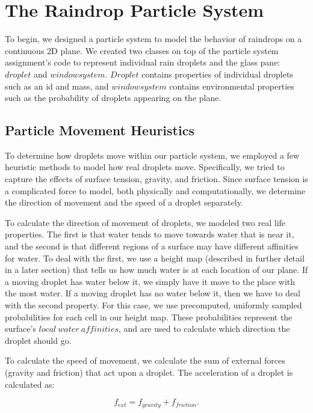 \documentclass[10pt,twocolumn,letterpaper]{article}
\begin{document}
\section{The Raindrop Particle System}

To begin, we designed a particle system to model the behavior of raindrops on a continuous 2D plane. We created two classes on top of the particle system assignment's code to represent individual rain droplets and the glass pane: $droplet$ and $windowsystem$. $Droplet$ contains properties of individual droplets such as an id and mass, and $windowsystem$ contains environmental properties such as the probability of droplets appearing on the plane.

\subsection{Particle Movement Heuristics}

To determine how droplets move within our particle system, we employed a few heuristic methods to model how real droplets move. Specifically, we tried to capture the effects of surface tension, gravity, and friction. Since surface tension is a complicated force to model, both physically and computationally, we determine the direction of movement and the speed of a droplet separately.

To calculate the direction of movement of droplets, we modeled two real life properties. The first is that water tends to move towards water that is near it, and the second is that different regions of a surface may have different affinities for water. To deal with the first, we use a height map (described in further detail in a later section) that tells us how much water is at each location of our plane. If a moving droplet has water below it, we simply have it move to the place with the most water. If a moving droplet has no water below it, then we have to deal with the second property. For this case, we use precomputed, uniformly sampled probabilities for each cell in our height map. These probabilities represent the surface's $local\ water\ affinities$, and are used to calculate which direction the droplet should go. 

To calculate the speed of movement, we calculate the sum of external forces (gravity and friction) that act upon a droplet. The acceleration of a droplet is calculated as:

\begin{equation}
    f_{ext} = f_{gravity} +f_{friction}.
\end{equation}
\end{document}
